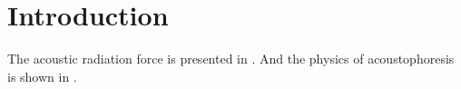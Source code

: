 \chapter{Introduction}

\blindtext

The acoustic radiation force is presented in . And the physics of acoustophoresis is shown in  .